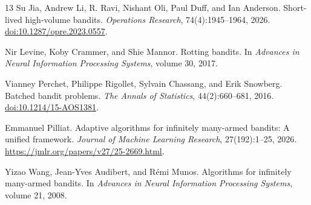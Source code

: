\documentclass[11pt,letterpaper]{article}
\numberwithin{equation}{section}
\theoremstyle{definition}
\theoremstyle{remark}
\newcommand{\1}{\mathbf{1}}
\begin{document}
\begin{thebibliography}{13}
Su Jia, Andrew Li, R. Ravi, Nishant Oli, Paul Duff, and Ian Anderson.
\newblock Short-lived high-volume bandits.
\newblock \emph{Operations Research}, 74(4):1945--1964, 2026.
\newblock \href{https://doi.org/10.1287/opre.2023.0557}
  {doi:10.1287/opre.2023.0557}.

Nir Levine, Koby Crammer, and Shie Mannor.
\newblock Rotting bandits.
\newblock In \emph{Advances in Neural Information Processing Systems},
volume 30, 2017.

Vianney Perchet, Philippe Rigollet, Sylvain Chassang, and Erik Snowberg.
\newblock Batched bandit problems.
\newblock \emph{The Annals of Statistics}, 44(2):660--681, 2016.
\newblock \href{https://doi.org/10.1214/15-AOS1381}
  {doi:10.1214/15-AOS1381}.

Emmanuel Pilliat.
\newblock Adaptive algorithms for infinitely many-armed bandits:
A unified framework.
\newblock \emph{Journal of Machine Learning Research}, 27(192):1--25, 2026.
\newblock \url{https://jmlr.org/papers/v27/25-2669.html}.

Yizao Wang, Jean-Yves Audibert, and R\'emi Munos.
\newblock Algorithms for infinitely many-armed bandits.
\newblock In \emph{Advances in Neural Information Processing Systems},
volume 21, 2008.

\end{thebibliography}
\end{document}

